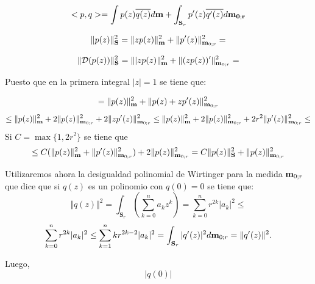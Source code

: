\documentclass[11pt]{article}
\begin{document}
$$
  <p,q>=\int p(z) \overline{q(z)}d{\bf m} + \int_{\mathbf{S}_r} p'(z) \overline{q'(z)}d{\bf m_{0;r}}
$$

$$
  \Vert p(z) \Vert^{2}_{\mathbf{S}} = \Vert zp(z) \Vert_{{\bf m}}^{2} + \Vert p'(z) \Vert^{2}_{{\bf m}_{0;r}}=
$$






$$
  \Vert \mathcal{D}(p(z))\Vert_{\mathbf{S}}^{2} = \Vert \vert zp(z)\Vert_{{\bf m}}^{2} + \Vert (zp(z))' \Vert^{2}_{{\bf m}_{0;r}}=
$$

\noindent Puesto que en la primera integral $\vert z \vert=1$ se tiene que:

$$
  =\Vert  p(z) \Vert_{{\bf m}}
  ^{2} + \Vert p(z)+zp'(z) \Vert^{2}_{{\bf m}_{0;r}}
$$
$$
  \leq \Vert  p(z) \Vert^2_{{\bf m}} + 2 \Vert  p(z) \Vert^2_{{\bf m}_{0;r}} + 2\Vert zp'(z) \Vert^{2}_{{\bf m}_{0;r}} \leq \Vert  p(z) \Vert^2_{{\bf m}} + 2 \Vert  p(z) \Vert^2_{{\bf m}_{0;r}} + 2r^2\Vert p'(z) \Vert^{2}_{{\bf m}_{0;r}} \leq
$$
\noindent Si $C= \max \{1,2r^2\}$ se tiene que
$$
  \leq C(\Vert  p(z) \Vert^2_{{\bf m}}+\Vert p'(z) \Vert^{2}_{{\bf m}_{0;r}})+2\Vert  p(z) \Vert^2_{{\bf m}_{0;r}}= C\Vert p(z) \Vert^{2}_{\mathbf{S}}+ \Vert  p(z) \Vert^2_{{\bf m}_{0;r}}
$$

\noindent Utilizaremos ahora la desigualdad polinomial de Wirtinger para la medida ${\bf m}_{0;r}$ que dice que si $q(z)$ es un polinomio con $q(0)=0$ se tiene que:
$$
  \Vert q(z) \Vert^{2} = \int_{\mathbf{S}_r} \left(\sum_{k=0}^{n} a_kz^k \right)= \sum_{k=0}^{n} r^{2k} \vert a_k \vert^{2} \leq
$$
$$
  \sum_{k=0}^{n} r^{2k}  \vert a_k \vert^{2}\leq \sum_{k=1}^{n} kr^{2k-2}\vert a_k \vert^{2} = \int_{\mathbf{S}_r} \vert q'(z)\vert^{2}d{\bf m}_{0;r}=  \Vert q'(z)\Vert^{2}.
$$


\noindent Luego,
$$
  \vert q(0) \vert
$$
\end{document}
